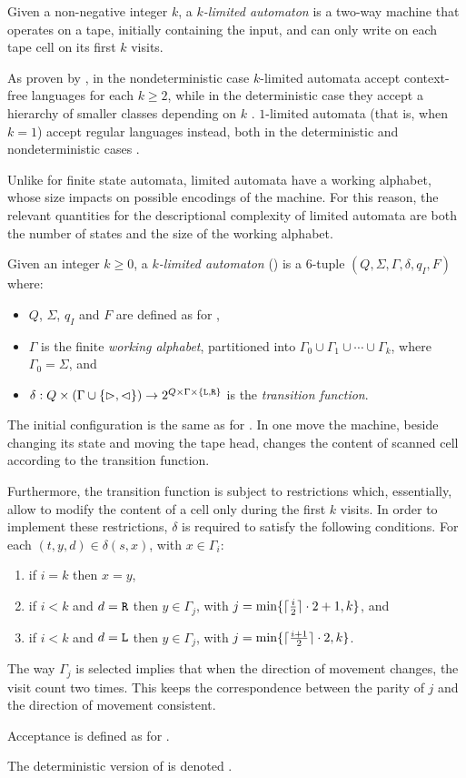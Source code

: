 Given a non-negative integer $k$, a \emph{$k$-limited automaton} is a two-way machine that operates on a tape, initially containing the input, and can only write on each tape cell on its first $k$ visits.

As proven by \citeauthor{Hib67}, in the nondeterministic case $k$-limited automata accept context-free languages for each $k\ge2$, while in the deterministic case they accept a hierarchy of smaller classes depending on $k$ \cite{Hib67}.
$1$-limited automata (that is, when $k=1$) accept regular languages instead, both in the deterministic and nondeterministic cases \cite{WagWec86}.

Unlike for finite state automata, limited automata have a working alphabet, whose size impacts on possible encodings of the machine.
For this reason, the relevant quantities for the descriptional complexity of limited automata are both the number of states and the size of the working alphabet.

\begin{defn}\label{def:kla}
	Given an integer $k\ge0$, a \emph{$k$-limited automaton} (\kLA) is a 6-tuple $(Q,\Sigma,\Gamma,\delta,q_I,F)$ where:
	\begin{itemize}
		\item $Q$, $\Sigma$, $q_I$ and $F$ are defined as for \TNFAs,
		\item $\Gamma$ is the finite \emph{working alphabet}, partitioned into $\Gamma_0\cup\Gamma_1\cup\cdots\cup\Gamma_k$, where $\Gamma_0=\Sigma$, and
		\item $\delta:Q\times(\Gamma\cup\{\rhd,\lhd\})\to2^{Q\times\Gamma\times\{\mathtt L,\mathtt R\}}$ is the \emph{transition function}.
	\end{itemize}
	The initial configuration is the same as for \TNFAs.
	In one move the machine, beside changing its state and moving the tape head, changes the content of scanned cell according to the transition function.

	Furthermore, the transition function is subject to restrictions which, essentially, allow to modify the content of a cell only during the first $k$ visits.
	In order to implement these restrictions, $\delta$ is required to satisfy the following conditions. For each $(t,y,d)\in\delta(s,x)$, with $x\in\Gamma_i$:
	\begin{enumerate}[(1)]
		\item if $i=k$ then $x=y$,
		\item if $i<k$ and $d=\mathtt R$ then $y\in\Gamma_j$, with $j=\min\{\lceil \frac{i}{2} \rceil\cdot 2+1,k\}$, and
		\item if $i<k$ and $d=\mathtt L$ then $y\in\Gamma_j$, with $j=\min\{\lceil \frac{i+1}{2} \rceil\cdot 2,k\}$.
	\end{enumerate}
	The way $\Gamma_j$ is selected implies that when the direction of movement changes, the visit count two times.
	This keeps the correspondence between the parity of $j$ and the direction of movement consistent.

	\noindent Acceptance is defined as for \TNFAs.

	\noindent The deterministic version of \kLAs is denoted \kDLAs.
\end{defn}


